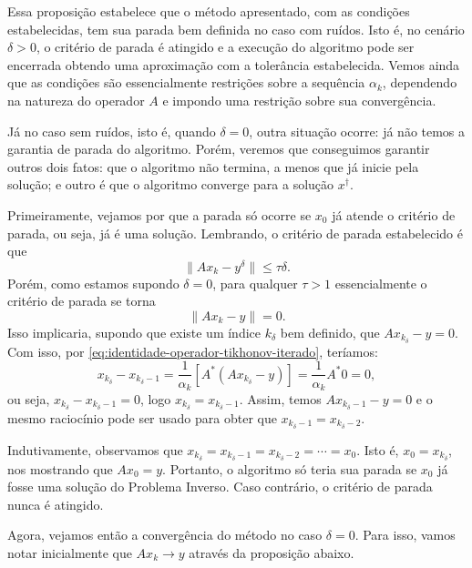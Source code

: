 Essa proposição estabelece que o método apresentado, com as condições estabelecidas, tem sua parada bem definida no caso com ruídos. Isto é, no cenário $\delta>0$, o critério de parada é atingido e a execução do algoritmo pode ser encerrada obtendo uma aproximação com a tolerância estabelecida. Vemos ainda que as condições são essencialmente restrições sobre a sequência $\alpha_k$, dependendo na natureza do operador $A$ e impondo uma restrição sobre sua convergência.

Já no caso sem ruídos, isto é, quando $\delta=0$, outra situação ocorre: já não temos a garantia de parada do algoritmo. Porém, veremos que conseguimos garantir outros dois fatos: que o algoritmo não termina, a menos que já inicie pela solução; e outro é que o algoritmo converge para a solução $x^\dag$.

Primeiramente, vejamos por que a parada só ocorre se $x_0$ já atende o critério de parada, ou seja, já é uma solução. Lembrando, o critério de parada estabelecido é que
\[
    \|Ax_k - y^\delta\|\leq \tau \delta.
\]
Porém, como estamos supondo $\delta = 0$, para qualquer $\tau>1$ essencialmente o critério de parada se torna
\[
\| Ax_k - y \| = 0.
\]
Isso implicaria, supondo que existe um índice $k_\delta$ bem definido, que $Ax_{k_\delta} - y = 0$. Com isso, por \eqref{eq:identidade-operador-tikhonov-iterado}, teríamos:
\[
x_{k_\delta} - x_{k_\delta-1} = \frac{1}{\alpha_k} \left[ A^* (Ax_{k_\delta} - y) \right] = \frac{1}{\alpha_k}A^*0 = 0,
\]
ou seja, $x_{k_\delta} - x_{k_\delta-1} = 0$, logo $x_{k_\delta} = x_{k_\delta-1}$. Assim, temos $Ax_{k_\delta-1} - y = 0$ e o mesmo raciocínio pode ser usado para obter que $x_{k_\delta-1} = x_{k_\delta-2}$. 

Indutivamente, observamos que $x_{k_\delta} = x_{k_\delta-1} = x_{k_\delta-2} = \cdots = x_0$. Isto é, $x_0 = x_{k_\delta}$, nos mostrando que $Ax_0 = y$. Portanto, o algoritmo só teria sua parada se $x_0$ já fosse uma solução do Problema Inverso. Caso contrário, o critério de parada nunca é atingido.

Agora, vejamos então a convergência do método no caso $\delta=0$. Para isso, vamos notar inicialmente que $Ax_k \to y$ através da proposição abaixo.

